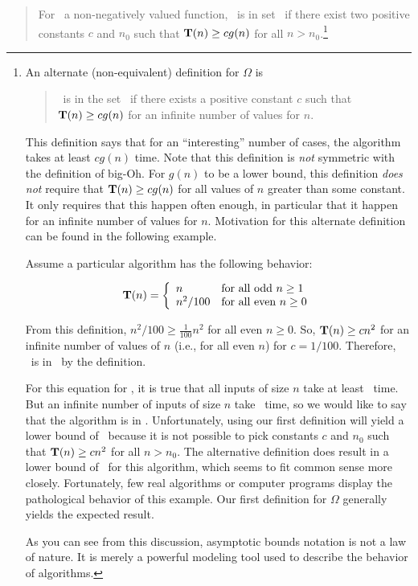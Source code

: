 \begin{quotation}
For \Tn\ a non-negatively valued function,
\Tn\ is in set \Omegagn\ if there exist two positive
constants \(c\) and \(n_0\) such that \(\mbox{$\textbf{T}(n)$} \geq c g(n)\) for all
\(n > n_0\).\footnote{
An alternate (non-equivalent) definition for \(\Omega\) is

\begin{quotation}
\Tn\ is in the set \Omegagn\ if there exists a positive constant
\(c\) such that \(\mbox{$\textbf{T}(n)$} \geq c g(n)\) for an infinite number of
values for \(n\).
\end{quotation}

This definition says that for an ``interesting'' number of
cases, the algorithm takes at least \(c g(n)\) time.
Note that this definition is \emph{not} symmetric with the definition
of big-Oh.
For \(g(n)\) to be a lower bound,
this definition \emph{does not} require that \(\mbox{$\textbf{T}(n)$} \geq c g(n)\) for
all values of \(n\) greater than some constant.
It only requires that this happen often enough, in particular that it
happen for an infinite number of values for \(n\).
Motivation for this alternate definition can be found in the
following example.

Assume a particular algorithm has the following behavior:

\vspace{-\smallskipamount}
\[\mbox{$\textbf{T}(n)$} = \left\{ \begin{array}{ll}
		n       & \mbox{for all odd}\ n \geq 1\\
		n^2/100 & \mbox{for all even}\ n \geq 0
               \end{array}
        \right. \]

\vspace{-\smallskipamount}
From this definition, \(n^2/100 \geq \frac{1}{100} n^2\) for all even
\(n \geq 0\).
So, \(\mbox{$\textbf{T}(n)$} \geq c n^2\) for an infinite number of values of \(n\)
(i.e., for all even \(n\)) for \(c = 1/100\).
Therefore, \Tn\ is in \Omegantwo\ by the definition.

For this equation for \Tn, it is true that all inputs
of size \(n\) take at least \cn\ time.
But an infinite number of inputs of size \(n\) take \cntwo\ time,
so we would like to say that the algorithm is in \Omegantwo.
Unfortunately, using our first definition will
yield a lower bound of \Omegan\ because it is not possible to pick
constants \(c\) and \(n_0\) such that \(\mbox{$\textbf{T}(n)$} \geq c n^2\) for all
\(n>n_0\).
The alternative definition does result in a lower
bound of \Omegantwo\ for this algorithm, which seems to fit common
sense more closely.
Fortunately, few real algorithms or computer programs display the
pathological behavior of this example.
Our first definition for \(\Omega\) generally yields the expected
result.

As you can see from this discussion, asymptotic bounds notation is
not a law of nature.
It is merely a powerful modeling tool used to describe the behavior
of algorithms.} %
\end{quotation}

